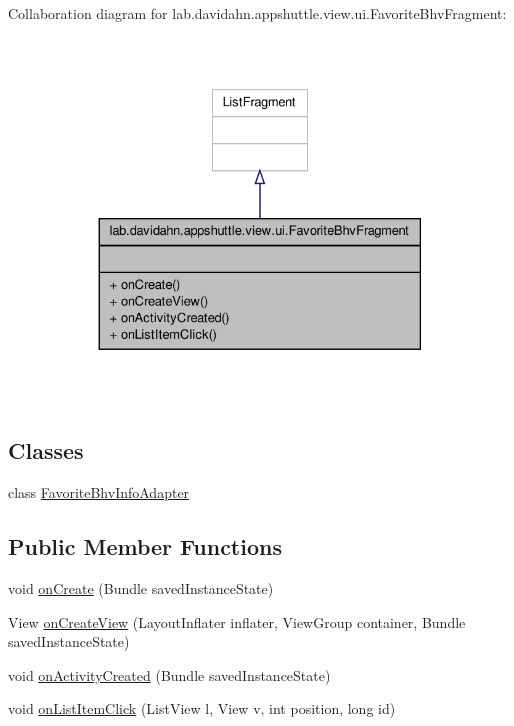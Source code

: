 \-Collaboration diagram for lab.\-davidahn.\-appshuttle.\-view.\-ui.\-Favorite\-Bhv\-Fragment\-:
\nopagebreak
\begin{figure}[H]
\begin{center}
\leavevmode
\includegraphics[width=330pt]{classlab_1_1davidahn_1_1appshuttle_1_1view_1_1ui_1_1_favorite_bhv_fragment__coll__graph}
\end{center}
\end{figure}
\subsection*{\-Classes}
\begin{DoxyCompactItemize}
\item 
class \hyperlink{classlab_1_1davidahn_1_1appshuttle_1_1view_1_1ui_1_1_favorite_bhv_fragment_1_1_favorite_bhv_info_adapter}{\-Favorite\-Bhv\-Info\-Adapter}
\end{DoxyCompactItemize}
\subsection*{\-Public \-Member \-Functions}
\begin{DoxyCompactItemize}
\item 
void \hyperlink{classlab_1_1davidahn_1_1appshuttle_1_1view_1_1ui_1_1_favorite_bhv_fragment_a85762d4d92fa0d0b5667cd505cf833df}{on\-Create} (\-Bundle saved\-Instance\-State)
\item 
\-View \hyperlink{classlab_1_1davidahn_1_1appshuttle_1_1view_1_1ui_1_1_favorite_bhv_fragment_afe3ad60dc8b5f95c861fa227cbdc930e}{on\-Create\-View} (\-Layout\-Inflater inflater, \-View\-Group container, \-Bundle saved\-Instance\-State)
\item 
void \hyperlink{classlab_1_1davidahn_1_1appshuttle_1_1view_1_1ui_1_1_favorite_bhv_fragment_add428cbbddc9804de0ff1d4a3cdbe66f}{on\-Activity\-Created} (\-Bundle saved\-Instance\-State)
\item 
void \hyperlink{classlab_1_1davidahn_1_1appshuttle_1_1view_1_1ui_1_1_favorite_bhv_fragment_abb791eb9585f7f5b2ae9f1cdaacb2a5a}{on\-List\-Item\-Click} (\-List\-View l, \-View v, int position, long id)
\end{DoxyCompactItemize}



